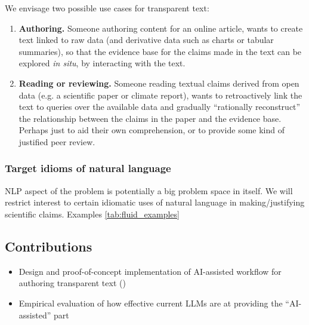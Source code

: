 

We envisage two possible use cases for transparent text:

\begin{enumerate}
\item \textbf{Authoring.} Someone authoring content for an online article, wants to create text
linked to raw data (and derivative data such as charts or tabular summaries), so that the evidence base for
the claims made in the text can be explored \emph{in situ}, by interacting with the text.

\item \textbf{Reading or reviewing.} Someone reading textual claims derived from open data (e.g. a
scientific paper or climate report), wants to retroactively link the text to queries over the available data
and gradually ``rationally reconstruct'' the relationship between the claims in the paper and the evidence
base. Perhaps just to aid their own comprehension, or to provide some kind of justified peer review.
\end{enumerate}

\subsubsection{Target idioms of natural language}

NLP aspect of the problem is potentially a big problem space in itself. We will restrict interest to certain
idiomatic uses of natural language in making/justifying scientific claims.
Examples \ref{tab:fluid_examples}



\subsection{Contributions}

\begin{itemize}
    \item Design and proof-of-concept implementation of AI-assisted workflow for authoring transparent text
    ()
    \item Empirical evaluation of how effective current LLMs are at providing the ``AI-assisted'' part
\end{itemize}
